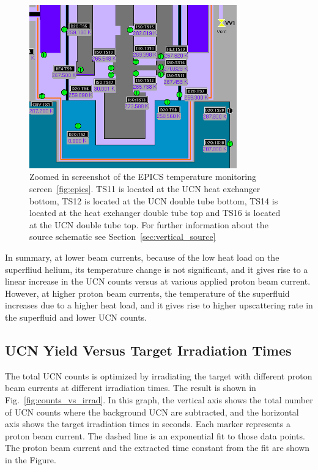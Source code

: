 \begin{figure}[h!]
  \centering
  \includegraphics[width=0.8\textwidth]{TSs.png}
  \caption{Zoomed in screenshot of the EPICS temperature monitoring
    screen~\ref{fig:epics}. TS11 is located at the UCN heat exchanger
    bottom, TS12 is located at the UCN double tube bottom, TS14 is
    located at the heat exchanger double tube top and TS16 is located
    at the UCN double tube top. For further information about the
    source schematic see Section~\ref{sec:vertical_source}}
  \label{fig:TSs}
\end{figure}

In summary, at lower beam currents, because of the low heat load on
the superfliud helium, its temperature change is not significant, and
it gives rise to a linear increase in the UCN counts versus at various
applied proton beam current. However, at higher proton beam currents,
the temperature of the superfluid increases due to a higher heat load,
and it gives rise to higher upscattering rate in the superfluid and
lower UCN counts.


\subsection{UCN Yield Versus Target Irradiation Times}
The total UCN counts is optimized by irradiating the target with
different proton beam currents at different irradiation times. The
result is shown in Fig.~\ref{fig:counts_vs_irrad}. In this graph, the
vertical axis shows the total number of UCN counts where the
background UCN are subtracted, and the horizontal axis shows the
target irradiation times in seconds. Each marker represents a proton
beam current. The dashed line is an exponential fit to those data
points. The proton beam current and the extracted time constant from
the fit are shown in the Figure.

